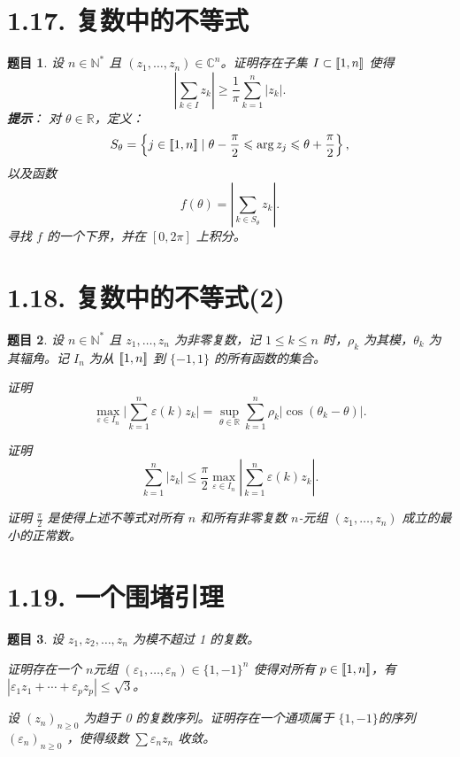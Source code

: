 \documentclass[12pt,UTF8]{ctexbook}
\theoremstyle{exercisestyle}
\newtheorem*{exercise}{题目}
\theoremstyle{solutionstyle}
\begin{document}
\section{1.17. 复数中的不等式}
\begin{exercise}
设 \( n \in \mathbb{N}^* \) 且 \( (z_1, \ldots, z_n) \in \mathbb{C}^n \)。证明存在子集 \( I \subset [\![1,n]\!] \) 使得
\[
\left| \sum_{k \in I} z_k \right| \geqslant \frac{1}{\pi} \sum_{k=1}^n |z_k|.
\]
\textbf{提示}：
对 \(\theta \in \mathbb{R}\)，定义：
\[
S_{\theta} = \left\{ j \in[\![1,n]\!] \mid \theta - \frac{\pi}{2} \leqslant \arg z_j \leqslant \theta + \frac{\pi}{2} \right\},
\]
以及函数
\[
f(\theta) = \left| \sum_{k \in S_{\theta}} z_k \right|.
\]
寻找 \( f \) 的一个下界，并在 \([0, 2\pi]\) 上积分。
\end{exercise}

\section{1.18. 复数中的不等式(2)}
\begin{exercise}
设 \( n \in \mathbb{N}^* \) 且 \( z_1, \ldots, z_n \) 为非零复数，记 \( 1 \leq k \leq n \) 时，\( \rho_k \) 为其模，\( \theta_k \) 为其辐角。记 \( I_n \) 为从 \([\![1,n]\!]\) 到 \(\{-1, 1\}\) 的所有函数的集合。
\begin{subquestions}
\item 证明
\[
\max_{\varepsilon \in I_n} \Big| \sum_{k=1}^n \varepsilon(k) z_k \Big| = \sup_{\theta \in \mathbb{R}} \sum_{k=1}^n \rho_k |\cos(\theta_k - \theta)|.
\]

\item 证明
\[
\sum_{k=1}^{n} |z_k| \leqslant \frac{\pi}{2} \max_{\varepsilon \in I_n} \left| \sum_{k=1}^{n} \varepsilon(k) z_k \right|.
\]

\item 证明 \( \displaystyle\frac{\pi}{2} \) 是使得上述不等式对所有 \( n \) 和所有非零复数 \( n \)-元组 \( (z_1,\ldots,z_n) \) 成立的最小的正常数。
\end{subquestions}
\end{exercise}

\section{1.19. 一个围堵引理}
\begin{exercise}
设 \( z_1, z_2, \ldots, z_n \) 为模不超过 1 的复数。
\begin{subquestions}
\item 证明存在一个 \( n \)元组 \( (\varepsilon_1, \ldots, \varepsilon_n) \in \{1, -1\}^n \) 使得对所有 \( p \in [\![1,n]\!] \)，有 \( |\varepsilon_1 z_1 + \cdots + \varepsilon_p z_p| \leqslant \sqrt{3} \)。
\item 设 \( (z_n)_{n \geq 0} \) 为趋于 0 的复数序列。证明存在一个通项属于 \( \{1, -1\} \)的序列 \( (\varepsilon_n)_{n \geqslant 0} \) ，使得级数 \( \sum \varepsilon_n z_n \) 收敛。
\end{subquestions}
\end{exercise}
\end{document}
